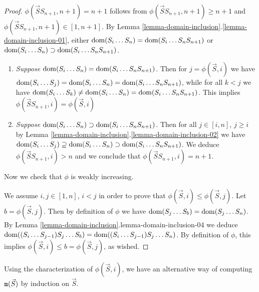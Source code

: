 \documentclass{lmcs}
\begin{document}
\begin{proof}
$\phi(\vec{S} S_{n+1}, n+1) = n+1$ follows from $\phi(\vec{S} S_{n+1}, n+1) \ge n+1$
and $\phi(\vec{S} S_{n+1}, n+1) \in [1,n+1]$. 
By Lemma \ref{lemma-domain-inclusion}.\ref{lemma-domain-inclusion-01}, 
either ${\rm dom}(S_i \ldots S_n) = {\rm dom}(S_i \ldots S_n S_{n+1})$ 
or ${\rm dom}(S_i \ldots S_n) \supset {\rm dom}(S_i \ldots S_n S_{n+1})$. 
\begin{enumerate}
\item
\emph{Suppose ${\rm dom}(S_i \ldots S_n) = {\rm dom}(S_i \ldots S_n S_{n+1})$}.
Then for $j = \phi(\vec{S},i)$
we have ${\rm dom}(S_i \ldots S_j) = {\rm dom}(S_i \ldots S_n) = {\rm dom}(S_i \ldots S_n S_{n+1})$,
while for all $k<j$ we have 
${\rm dom}(S_i \ldots S_k) \not = {\rm dom}(S_i \ldots S_n) = {\rm dom}(S_i \ldots S_n S_{n+1})$.
This implies $\phi(\vec{S}S_{n+1},i) = \phi(\vec{S},i)$

\item
\emph{Suppose ${\rm dom}(S_i \ldots S_n) \supset {\rm dom}(S_i \ldots S_n S_{n+1})$}.
Then for all $j \in [i,n]$, $j \ge i$ 
by Lemma \ref{lemma-domain-inclusion}.\ref{lemma-domain-inclusion-02} 
we have 
${\rm dom}(S_i \ldots S_j)  \supseteq {\rm dom}(S_i \ldots S_n) \supset {\rm dom}(S_i \ldots S_n S_{n+1})$.
We deduce $\phi(\vec{S}S_{n+1},i) >n$ 
and we conclude that $\phi(\vec{S}S_{n+1},i) = n+1$.

\end{enumerate}

Now we check that $\phi$ is weakly increasing.

We assume $i,j \in [1,n]$, $i < j$ in order to prove that $\phi(\vec{S},i) \le \phi(\vec{S},j)$.
Let $b =  \phi(\vec{S},j)$. Then by definition of $\phi$ we have 
${\rm dom}(S_j \ldots S_b) = {\rm dom}(S_j \ldots S_n)$. 
By Lemma \ref{lemma-domain-inclusion}.{lemma-domain-inclusion-04} we deduce
${\rm dom}((S_i \ldots S_{j-1}) S_j \ldots S_b) = {\rm dom}((S_i \ldots S_{j-1}) S_j \ldots S_n)$.
By definition of $\phi$, this implies $\phi(\vec{S},i) \le b =  \phi(\vec{S},j)$,
as wished.
\end{proof}

 Using the characterization of $\phi(\vec{S},i)$, we have an alternative
way of computing ${\tt m}(\vec{S})$ by induction on $\vec{S}$.
\end{document}
